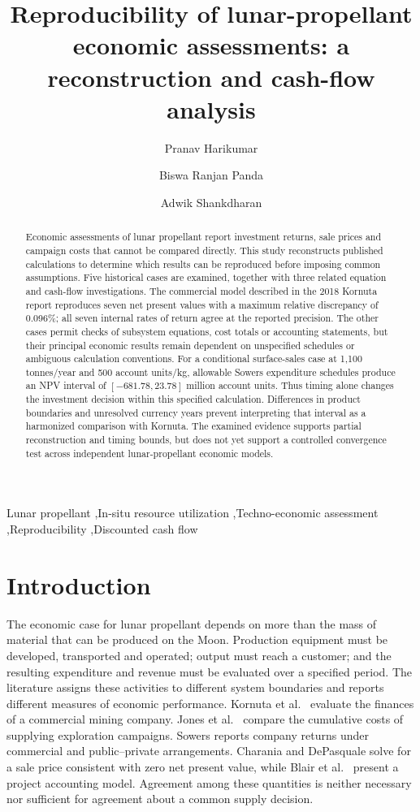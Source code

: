 \documentclass[final,5p,times,twocolumn]{elsarticle}
\begin{document}
\begin{frontmatter}
\title{Reproducibility of lunar-propellant economic assessments: a reconstruction and cash-flow analysis}
\author{Pranav Harikumar}
\author{Biswa Ranjan Panda}
\author{Adwik Shankdharan}
\address{Independent researchers, Toram Labs}
\begin{abstract}
Economic assessments of lunar propellant report investment returns, sale prices and campaign costs that cannot be compared directly. This study reconstructs published calculations to determine which results can be reproduced before imposing common assumptions. Five historical cases are examined, together with three related equation and cash-flow investigations. The commercial model described in the 2018 Kornuta report reproduces seven net present values with a maximum relative discrepancy of 0.096\%; all seven internal rates of return agree at the reported precision. The other cases permit checks of subsystem equations, cost totals or accounting statements, but their principal economic results remain dependent on unspecified schedules or ambiguous calculation conventions. For a conditional surface-sales case at 1,100 tonnes/year and 500 account units/kg, allowable Sowers expenditure schedules produce an NPV interval of $[-681.78,23.78]$ million account units. Thus timing alone changes the investment decision within this specified calculation. Differences in product boundaries and unresolved currency years prevent interpreting that interval as a harmonized comparison with Kornuta. The examined evidence supports partial reconstruction and timing bounds, but does not yet support a controlled convergence test across independent lunar-propellant economic models.
\end{abstract}
\begin{keyword}
Lunar propellant \sep In-situ resource utilization \sep Techno-economic assessment \sep Reproducibility \sep Discounted cash flow
\end{keyword}
\end{frontmatter}

\section{Introduction}
The economic case for lunar propellant depends on more than the mass of material that can be produced on the Moon. Production equipment must be developed, transported and operated; output must reach a customer; and the resulting expenditure and revenue must be evaluated over a specified period. The literature assigns these activities to different system boundaries and reports different measures of economic performance. Kornuta et al.\ \cite{kornuta2018,kornuta2019} evaluate the finances of a commercial mining company. Jones et al.\ \cite{jones2020} compare the cumulative costs of supplying exploration campaigns. Sowers \cite{sowers2020,sowers2021} reports company returns under commercial and public--private arrangements. Charania and DePasquale \cite{charania2007} solve for a sale price consistent with zero net present value, while Blair et al.\ \cite{blair2002} present a project accounting model. Agreement among these quantities is neither necessary nor sufficient for agreement about a common supply decision.
\end{document}
